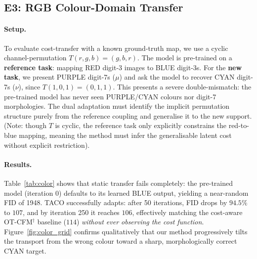 \documentclass[11pt]{article}
\theoremstyle{definition}
\numberwithin{equation}{section}%
\begin{document}

\subsection{E3: RGB Colour-Domain Transfer}
\label{sec:e3}

\paragraph{Setup.} To evaluate cost-transfer with a known ground-truth map, we use a cyclic channel-permutation $T(r,g,b) = (g,b,r)$.
The model is pre-trained on a \textbf{reference task}: mapping RED digit-3 images to BLUE digit-3s.
For the \textbf{new task}, we present PURPLE digit-7s ($\mu$) and ask the model to recover CYAN digit-7s ($\nu$), since $T(1,0,1) = (0,1,1)$.
This presents a severe double-mismatch: the pre-trained model has never seen PURPLE/CYAN colours nor digit-7 morphologies.
The dual adaptation must identify the implicit permutation structure purely from the reference coupling and generalise it to the new support.
(Note: though $T$ is cyclic, the reference task only explicitly constrains the red-to-blue mapping, meaning the method must infer the generalisable latent cost without explicit restriction).

\paragraph{Results.} Table~\ref{tab:color} shows that static transfer fails completely: the pre-trained model (iteration 0) defaults to its learned BLUE output, yielding a near-random FID of 1948.
TACO successfully adapts: after 50 iterations, FID drops by $94.5\%$ to $107$, and by iteration 250 it reaches $106$, effectively matching the cost-aware OT-CFM$^\dagger$ baseline ($114$) \emph{without ever observing the cost function}.
Figure~\ref{fig:color_grid} confirms qualitatively that our method progressively tilts the transport from the wrong colour toward a sharp, morphologically correct CYAN target.


\end{document}
